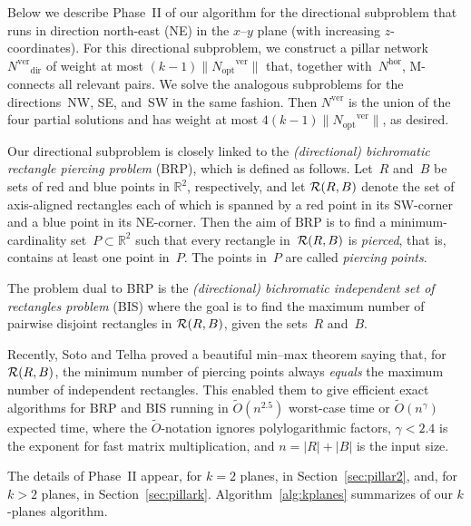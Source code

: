 \documentclass[11pt]{llncs}
\newcommand{\R}{\ensuremath{\mathbb{R}}}
\newcommand{\Nopt}{\ensuremath{N_\mathrm{opt}}\xspace}
\newcommand{\Nhor}{\ensuremath{N^\mathrm{hor}}\xspace}
\newcommand{\Nver}{\ensuremath{N^\mathrm{ver}}\xspace}
\newcommand{\dir}{\ensuremath{\mathrm{dir}}}
\newcommand{\Noptver}{\ensuremath{\Nopt^\mathrm{ver}}\xspace}
\newcommand{\red}{\ensuremath{R}\xspace}
\newcommand{\blue}{\ensuremath{B}\xspace}
\newcommand{\BRP}{\ensuremath{\mathrm{BRP}}\xspace}
\begin{document}
Below we describe Phase~II of our algorithm 
for the directional subproblem 
that runs in direction north-east (NE) in the $x$--$y$
plane (with increasing $z$-coordinates). For this directional subproblem, we
construct a pillar
network~$\Nver_\dir$ of weight at most $(k-1)\|\Noptver\|$ that, together
with~\Nhor, M-connects all relevant pairs.   
We solve the analogous
subproblems for the directions~NW, SE, and~SW in the same fashion.
Then \Nver is the union of the four partial solutions and has weight
at most $4(k-1)\|\Noptver\|$, as desired.


Our directional subproblem is closely linked to the
\emph{(directional) bichromatic rectangle piercing problem} (\BRP),
which is defined as follows.  Let~\red and~\blue be sets of red and
blue points in $\R^2$, respectively, and let ${\cal R}(\red,\blue)$
denote the set of axis-aligned rectangles each of which is spanned by
a red point in its SW-corner and a blue point in its NE-corner.  Then
the aim of \BRP is to find a minimum-cardinality set~$P \subset \R^2$
such that every rectangle in~${\cal R}(\red,\blue)$ is \emph{pierced},
that is, contains at least one point in~$P$.  The points in~$P$ are
called \emph{piercing points}. 

The problem dual to BRP is the \emph{(directional) bichromatic
  independent set of rectangles problem} (BIS) where the goal is to
find the maximum number of pairwise disjoint rectangles in ${\cal
  R}(\red,\blue)$, given the sets~\red and~\blue.

Recently, Soto and Telha \cite{st-2dorg-11} proved a beautiful
min--max theorem saying that, for ${\cal R}(\red,\blue)$, the
minimum number of piercing points always \emph{equals} the maximum
number of independent rectangles.  This enabled them to give efficient
exact algorithms for \BRP and BIS running in $\tilde{O}(n^{2.5})$
worst-case time or $\tilde{O}(n^{\gamma})$ expected time, where the
$\tilde{O}$-notation ignores polylogarithmic factors, $\gamma <
2.4$ is the exponent for fast matrix multiplication, and
$n=|\red|+|\blue|$ is the input size.

The details of Phase~II appear, for $k=2$ planes, in Section~\ref{sec:pillar2},
and, for $k>2$ planes, in Section~\ref{sec:pillark}.
Algorithm~\ref{alg:kplanes} summarizes of our $k$-planes algorithm.
\end{document}
